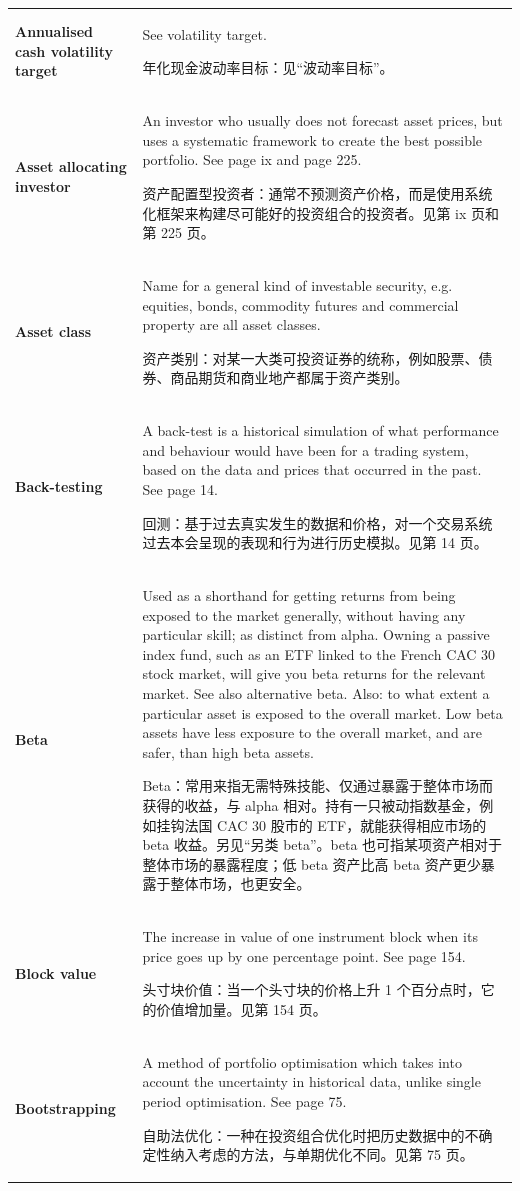 \begin{chinesetableblock}
{\begin{longtable}{@{}>{\raggedright\arraybackslash\bfseries} p{}>{\raggedright\arraybackslash} p{}@{}}
Annualised cash volatility target & See volatility target. \par 年化现金波动率目标：见“波动率目标”。 \\[0.65em]
Asset allocating investor & An investor who usually does not forecast asset prices, but uses a systematic framework to create the best possible portfolio. See page ix and page 225. \par 资产配置型投资者：通常不预测资产价格，而是使用系统化框架来构建尽可能好的投资组合的投资者。见第 ix 页和第 225 页。 \\[0.65em]
Asset class & Name for a general kind of investable security, e.g. equities, bonds, commodity futures and commercial property are all asset classes. \par 资产类别：对某一大类可投资证券的统称，例如股票、债券、商品期货和商业地产都属于资产类别。 \\[0.65em]
Back-testing & A back-test is a historical simulation of what performance and behaviour would have been for a trading system, based on the data and prices that occurred in the past. See page 14. \par 回测：基于过去真实发生的数据和价格，对一个交易系统过去本会呈现的表现和行为进行历史模拟。见第 14 页。 \\[0.65em]
Beta & Used as a shorthand for getting returns from being exposed to the market generally, without having any particular skill; as distinct from alpha. Owning a passive index fund, such as an ETF linked to the French CAC 30 stock market, will give you beta returns for the relevant market. See also alternative beta. Also: to what extent a particular asset is exposed to the overall market. Low beta assets have less exposure to the overall market, and are safer, than high beta assets. \par Beta：常用来指无需特殊技能、仅通过暴露于整体市场而获得的收益，与 alpha 相对。持有一只被动指数基金，例如挂钩法国 CAC 30 股市的 ETF，就能获得相应市场的 beta 收益。另见“另类 beta”。beta 也可指某项资产相对于整体市场的暴露程度；低 beta 资产比高 beta 资产更少暴露于整体市场，也更安全。 \\[0.65em]
Block value & The increase in value of one instrument block when its price goes up by one percentage point. See page 154. \par 头寸块价值：当一个头寸块的价格上升 1 个百分点时，它的价值增加量。见第 154 页。 \\[0.65em]
Bootstrapping & A method of portfolio optimisation which takes into account the uncertainty in historical data, unlike single period optimisation. See page 75. \par 自助法优化：一种在投资组合优化时把历史数据中的不确定性纳入考虑的方法，与单期优化不同。见第 75 页。 \\[0.65em]

\end{longtable}}
\end{chinesetableblock}
